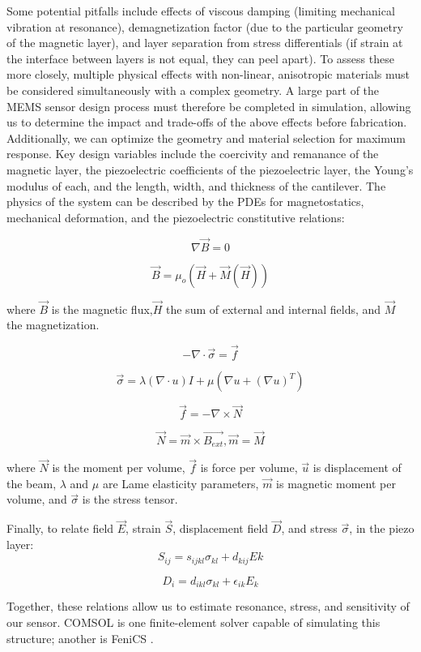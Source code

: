  Some potential pitfalls include effects of viscous damping (limiting mechanical vibration at resonance), demagnetization factor (due to the particular geometry of the magnetic layer), and layer separation from stress differentials (if strain at the interface between layers is not equal, they can peel apart). To assess these more closely, multiple physical effects with non-linear, anisotropic materials must be considered simultaneously with a complex geometry. A large part of the MEMS sensor design process must therefore be completed in simulation, allowing us to determine the impact and trade-offs of the above effects before fabrication. Additionally, we can optimize the geometry and material selection for maximum response. Key design variables include the coercivity and remanance of the magnetic layer, the piezoelectric coefficients of the piezoelectric layer, the Young's modulus of each, and the length, width, and thickness of the cantilever. The physics of the system can be described by the PDEs for magnetostatics, mechanical deformation, and the piezoelectric constitutive relations:

 $$ \nabla \vec{B} = 0$$

 $$ \vec{B} = \mu_o(\vec{H}+\vec{M}(\vec{H}))$$

where $\vec{B}$ is the magnetic flux,$\vec{H}$ the sum of external and internal fields, and $\vec{M}$ the magnetization.
 
 $$ -\nabla\cdot\vec{\sigma}=\vec{f}$$
 
 $$ \vec{\sigma} = \lambda(\nabla\cdot u)I+\mu(\nabla u +(\nabla u)^T)$$

 $$ \vec{f} = -\nabla\times\vec{N}$$
 
$$ \vec{N} = \vec{m} \times \vec{B_{ext}}, \vec{m} = \vec{M} $$

where $\vec{N}$ is the moment per volume, $\vec{f}$ is force per volume, $\vec{u}$ is displacement of the beam, $\lambda$ and $\mu$ are Lame elasticity parameters, $\vec{m}$ is magnetic moment per volume, and $\vec{\sigma}$ is the stress tensor.

Finally, to relate field $\vec{E}$, strain $\vec{S}$, displacement field $\vec{D}$, and stress $\vec{\sigma}$, in the piezo layer:
 $$S_{ij} = s_{ijkl}\sigma_{kl}+d_{kij}E{k}$$

$$D_i=d_{ikl}\sigma_{kl}+\epsilon_{ik}E_{k}$$
 
Together, these relations allow us to estimate resonance, stress, and sensitivity of our sensor. COMSOL is one finite-element solver capable of simulating  this structure; another is FeniCS \cite{dupont2003fenics}.


